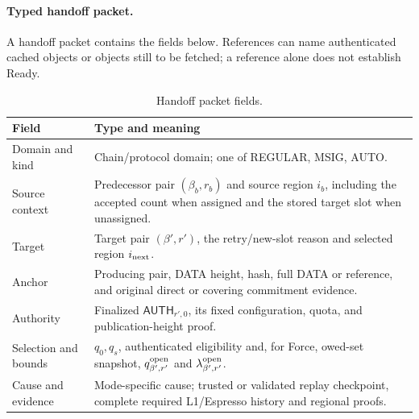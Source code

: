 \documentclass[11pt,a4paper]{article}
\newcommand{\tagg}[1]{\ensuremath{\mathsf{#1}}}
\newcounter{protocol}
\begin{document}
\paragraph{Typed handoff packet.}
A handoff packet contains the fields below. References can name
authenticated cached objects or objects still to be fetched; a reference
alone does not establish Ready.
\begin{table}[htbp]\centering\small
\caption{Handoff packet fields.}
\label{tab:handoff-packet}
\begin{tabularx}{\linewidth}{@{}>{\raggedright\arraybackslash}p{.26\linewidth}Y@{}}\toprule
Field & Type and meaning\\\midrule
Domain and kind & Chain/protocol domain; one of REGULAR, MSIG, AUTO.\\
Source context & Predecessor pair $(\beta_b,r_b)$ and source region
$i_b$, including the accepted count when assigned and the stored target
slot when unassigned.\\
Target & Target pair $(\beta',r')$, the retry/new-slot reason and selected
region $i_{\rm next}$.\\
Anchor & Producing pair, DATA height, hash, full DATA or reference,
and original direct or covering commitment evidence.\\
Authority & Finalized $\tagg{AUTH}_{r',0}$, its fixed configuration,
quota, and publication-height proof.\\
Selection and bounds & $q_0,q_s$, authenticated eligibility and,
for Force, owed-set snapshot,
$q^{\rm open}_{\beta',r'}$ and $\lambda^{\rm open}_{\beta',r'}$.\\
Cause and evidence & Mode-specific cause; trusted or validated replay
checkpoint, complete required L1/Espresso history and regional proofs.\\\bottomrule
\end{tabularx}
\end{table}
\end{document}
